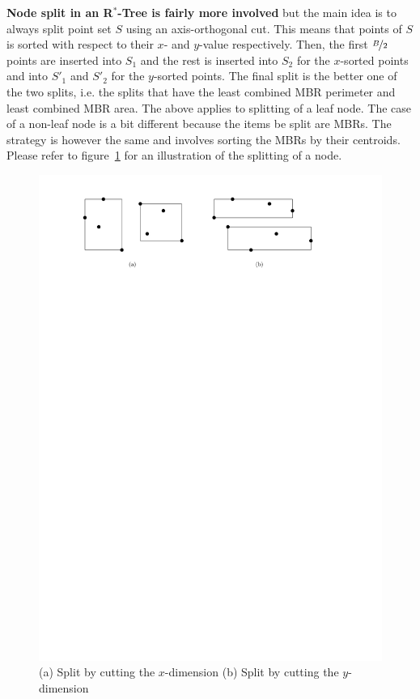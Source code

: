 \documentclass[twoside,11pt,openright]{report}
\begin{document}
\textbf{Node split in an R$^*$-Tree is fairly more involved} but the main idea is to always split point set $S$ using an axis-orthogonal cut. This means that points of $S$ is sorted with respect to their $x$- and $y$-value respectively. Then, the first $\nicefrac{B}{2}$ points are inserted into $S_1$ and the rest is inserted into $S_2$ for the $x$-sorted points and into $S'_1$ and $S'_2$ for the $y$-sorted points. The final split is the better one of the two splits, i.e. the splits that have the least combined MBR perimeter and least combined MBR area. The above applies to splitting of a leaf node. The case of a non-leaf node is a bit different because the items be split are MBRs. The strategy is however the same and involves sorting the MBRs by their centroids. Please refer to figure~\ref{fig:r_tree_splitting} for an illustration of the splitting of a node.

\begin{figure}[h]
	\centering
     \includegraphics[width=\textwidth]{../figures/r_tree_splitting}
     \caption{(a) Split by cutting the $x$-dimension (b) Split by cutting the $y$-dimension}
     \label{fig:r_tree_splitting}
\end{figure}
\end{document}
